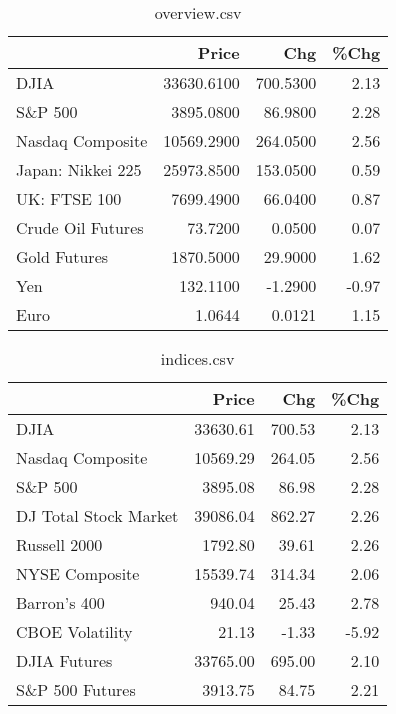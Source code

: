 \documentclass{article}%
\begin{document}
\begin{table}[htbp]%
\caption{overview.csv}%
\centering%
\begin{adjustbox}{width=1\textwidth}%
\begin{tabular}{lrrr}
\toprule
                  &      Price &      Chg &  \%Chg \\
\midrule
             DJIA & 33630.6100 & 700.5300 &  2.13 \\
          S\&P 500 &  3895.0800 &  86.9800 &  2.28 \\
 Nasdaq Composite & 10569.2900 & 264.0500 &  2.56 \\
Japan: Nikkei 225 & 25973.8500 & 153.0500 &  0.59 \\
     UK: FTSE 100 &  7699.4900 &  66.0400 &  0.87 \\
Crude Oil Futures &    73.7200 &   0.0500 &  0.07 \\
     Gold Futures &  1870.5000 &  29.9000 &  1.62 \\
              Yen &   132.1100 &  -1.2900 & -0.97 \\
             Euro &     1.0644 &   0.0121 &  1.15 \\
\bottomrule
\end{tabular}
%
\end{adjustbox}%
\end{table}

%


\begin{table}[htbp]%
\caption{indices.csv}%
\centering%
\begin{adjustbox}{width=1\textwidth}%
\begin{tabular}{lrrr}
\toprule
                      &    Price &    Chg &  \%Chg \\
\midrule
                 DJIA & 33630.61 & 700.53 &  2.13 \\
     Nasdaq Composite & 10569.29 & 264.05 &  2.56 \\
              S\&P 500 &  3895.08 &  86.98 &  2.28 \\
DJ Total Stock Market & 39086.04 & 862.27 &  2.26 \\
         Russell 2000 &  1792.80 &  39.61 &  2.26 \\
       NYSE Composite & 15539.74 & 314.34 &  2.06 \\
         Barron's 400 &   940.04 &  25.43 &  2.78 \\
      CBOE Volatility &    21.13 &  -1.33 & -5.92 \\
         DJIA Futures & 33765.00 & 695.00 &  2.10 \\
      S\&P 500 Futures &  3913.75 &  84.75 &  2.21 \\
\bottomrule
\end{tabular}
%
\end{adjustbox}%
\end{table}
\end{document}
